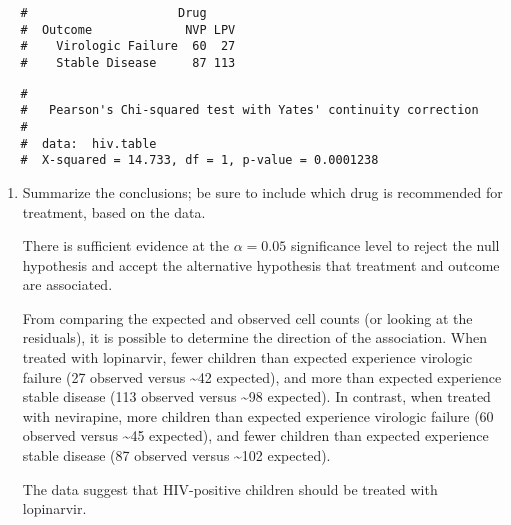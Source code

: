 \documentclass[letterpaper,12pt,twoside,]{pinp}
\begin{document}
\begin{enumerate}
  \begin{ShadedResult}
   \begin{verbatim}
   #                     Drug
   #  Outcome             NVP LPV
   #    Virologic Failure  60  27
   #    Stable Disease     87 113
   \end{verbatim}
   \end{ShadedResult}

\begin{Shaded}
\begin{Highlighting}[]
\end{Highlighting}
\end{Shaded}

  \begin{ShadedResult}
   \begin{verbatim}
   #  
   #   Pearson's Chi-squared test with Yates' continuity correction
   #  
   #  data:  hiv.table
   #  X-squared = 14.733, df = 1, p-value = 0.0001238
   \end{verbatim}
   \end{ShadedResult}

  \begin{enumerate}
  \def\labelenumii{\alph{enumii})}
  \setcounter{enumii}{6}
  \item
    Summarize the conclusions; be sure to include which drug is
    recommended for treatment, based on the data.

    \color{blue}

    There is sufficient evidence at the \(\alpha = 0.05\) significance
    level to reject the null hypothesis and accept the alternative
    hypothesis that treatment and outcome are associated.

    From comparing the expected and observed cell counts (or looking at
    the residuals), it is possible to determine the direction of the
    association. When treated with lopinarvir, fewer children than
    expected experience virologic failure (27 observed versus
    \textasciitilde42 expected), and more than expected experience
    stable disease (113 observed versus \textasciitilde98 expected). In
    contrast, when treated with nevirapine, more children than expected
    experience virologic failure (60 observed versus \textasciitilde45
    expected), and fewer children than expected experience stable
    disease (87 observed versus \textasciitilde102 expected).

    The data suggest that HIV-positive children should be treated with
    lopinarvir.


\end{enumerate}
\end{enumerate}
\end{document}
